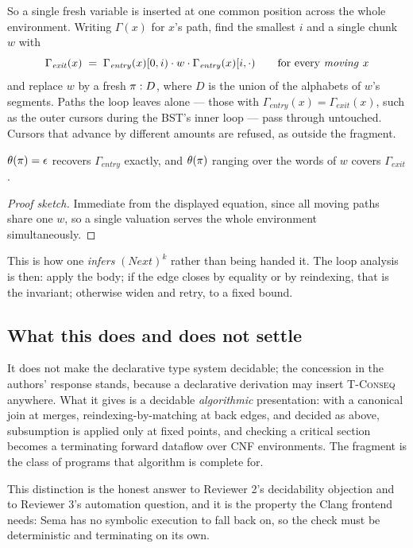 So a single fresh variable is inserted at one common position across the whole
environment.  Writing $\Gamma(x)$ for $x$'s path, find the smallest $i$ and a
single chunk $w$ with
\[
\Gamma_{\mathit{exit}}(x) \;=\; \Gamma_{\mathit{entry}}(x)[0,i) \cdot w \cdot \Gamma_{\mathit{entry}}(x)[i,\cdot)
\qquad\text{for every \emph{moving} } x
\]
and replace $w$ by a fresh $\pi : D$, where $D$ is the union of the alphabets
of $w$'s segments.  Paths the loop leaves alone --- those with
$\Gamma_{\mathit{entry}}(x) = \Gamma_{\mathit{exit}}(x)$, such as the outer
cursors during the BST's inner loop --- pass through untouched.  Cursors that
advance by different amounts are refused, as outside the fragment.

\begin{lemma}
\label{lem:widen-sound}
$\theta(\pi) = \epsilon$ recovers $\Gamma_{\mathit{entry}}$ exactly, and
$\theta(\pi)$ ranging over the words of $w$ covers $\Gamma_{\mathit{exit}}$.
\end{lemma}
\begin{proof}[Proof sketch]
Immediate from the displayed equation, since all moving paths share one $w$, so
a single valuation serves the whole environment simultaneously.
\end{proof}

This is how one \emph{infers} $(\textit{Next})^{k}$ rather than being handed it.
The loop analysis is then: apply the body; if the edge closes by equality or by
reindexing, that is the invariant; otherwise widen and retry, to a fixed bound.

\subsection{What this does and does not settle}
\label{sec:pathfrag-decid}

It does not make the declarative type system decidable; the concession in the
authors' response stands, because a declarative derivation may insert
\textsc{T-Conseq} anywhere.  What it gives is a decidable \emph{algorithmic}
presentation: with a canonical join at merges, reindexing-by-matching at back
edges, and \MayAlias{} decided as above, subsumption is applied only at fixed
points, and checking a critical section becomes a terminating forward dataflow
over CNF environments.  The fragment is the class of programs that algorithm is
complete for.

This distinction is the honest answer to Reviewer 2's decidability objection and
to Reviewer 3's automation question, and it is the property the Clang frontend
needs: \textsf{Sema} has no symbolic execution to fall back on, so the check must
be deterministic and terminating on its own.

